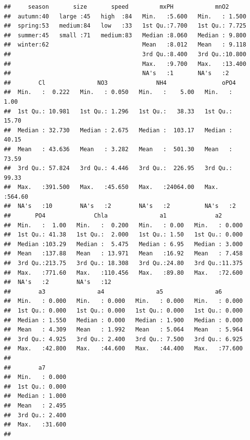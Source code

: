 \documentclass[]{report}
\begin{document}
\begin{verbatim}
##     season       size       speed         mxPH            mnO2       
##  autumn:40   large :45   high  :84   Min.   :5.600   Min.   : 1.500  
##  spring:53   medium:84   low   :33   1st Qu.:7.700   1st Qu.: 7.725  
##  summer:45   small :71   medium:83   Median :8.060   Median : 9.800  
##  winter:62                           Mean   :8.012   Mean   : 9.118  
##                                      3rd Qu.:8.400   3rd Qu.:10.800  
##                                      Max.   :9.700   Max.   :13.400  
##                                      NA's   :1       NA's   :2       
##        Cl               NO3              NH4                oPO4       
##  Min.   :  0.222   Min.   : 0.050   Min.   :    5.00   Min.   :  1.00  
##  1st Qu.: 10.981   1st Qu.: 1.296   1st Qu.:   38.33   1st Qu.: 15.70  
##  Median : 32.730   Median : 2.675   Median :  103.17   Median : 40.15  
##  Mean   : 43.636   Mean   : 3.282   Mean   :  501.30   Mean   : 73.59  
##  3rd Qu.: 57.824   3rd Qu.: 4.446   3rd Qu.:  226.95   3rd Qu.: 99.33  
##  Max.   :391.500   Max.   :45.650   Max.   :24064.00   Max.   :564.60  
##  NA's   :10        NA's   :2        NA's   :2          NA's   :2       
##       PO4              Chla               a1              a2        
##  Min.   :  1.00   Min.   :  0.200   Min.   : 0.00   Min.   : 0.000  
##  1st Qu.: 41.38   1st Qu.:  2.000   1st Qu.: 1.50   1st Qu.: 0.000  
##  Median :103.29   Median :  5.475   Median : 6.95   Median : 3.000  
##  Mean   :137.88   Mean   : 13.971   Mean   :16.92   Mean   : 7.458  
##  3rd Qu.:213.75   3rd Qu.: 18.308   3rd Qu.:24.80   3rd Qu.:11.375  
##  Max.   :771.60   Max.   :110.456   Max.   :89.80   Max.   :72.600  
##  NA's   :2        NA's   :12                                        
##        a3               a4               a5               a6        
##  Min.   : 0.000   Min.   : 0.000   Min.   : 0.000   Min.   : 0.000  
##  1st Qu.: 0.000   1st Qu.: 0.000   1st Qu.: 0.000   1st Qu.: 0.000  
##  Median : 1.550   Median : 0.000   Median : 1.900   Median : 0.000  
##  Mean   : 4.309   Mean   : 1.992   Mean   : 5.064   Mean   : 5.964  
##  3rd Qu.: 4.925   3rd Qu.: 2.400   3rd Qu.: 7.500   3rd Qu.: 6.925  
##  Max.   :42.800   Max.   :44.600   Max.   :44.400   Max.   :77.600  
##                                                                     
##        a7        
##  Min.   : 0.000  
##  1st Qu.: 0.000  
##  Median : 1.000  
##  Mean   : 2.495  
##  3rd Qu.: 2.400  
##  Max.   :31.600  
## 
\end{verbatim}
\end{document}
